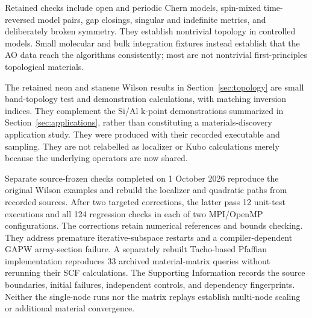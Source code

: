 Retained checks include open and periodic Chern models, spin-mixed
time-reversed model pairs, gap closings, singular and indefinite
metrics, and deliberately broken symmetry.
They establish nontrivial topology in controlled models.
Small molecular and bulk integration fixtures instead establish that
the AO data reach the algorithms consistently; most are not
nontrivial first-principles topological materials.

The retained neon and stanene Wilson results in
Section~\ref{sec:topology} are small band-topology test and demonstration
calculations, with matching inversion indices. They complement the
Si/Al k-point demonstrations summarized in
Section~\ref{sec:applications}, rather than constituting a
materials-discovery application study.
They were produced with their recorded executable and sampling.
They are not relabelled as localizer or Kubo calculations merely
because the underlying operators are now shared.

Separate source-frozen checks completed on 1 October 2026 reproduce the
original Wilson examples and rebuild the localizer and quadratic paths
from recorded sources. After two targeted corrections, the latter pass
12 unit-test executions and all 124 regression checks in each of two
MPI/OpenMP configurations. The corrections retain numerical references
and bounds checking. They address premature iterative-subspace restarts
and a compiler-dependent GAPW array-section failure.
A separately rebuilt Tacho-based Pfaffian implementation reproduces 33 archived
material-matrix queries without rerunning their SCF calculations.
The Supporting Information records the source boundaries, initial
failures, independent controls, and dependency fingerprints.
Neither the single-node runs nor the matrix replays establish multi-node
scaling or additional material convergence.

